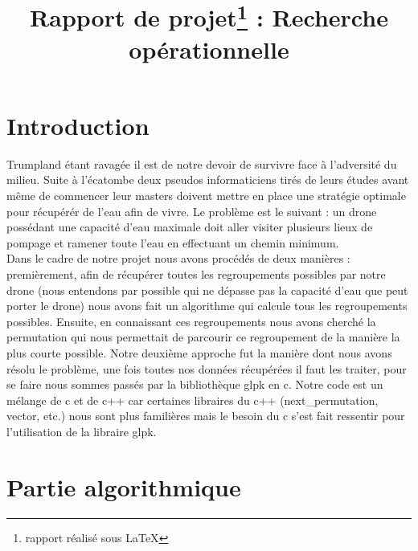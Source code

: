 \documentclass[a4paper,sffamily,12pt]{article}
\title{\vspace{\fill}\LARGE\bfseries\sffamily Rapport de projet\protect\footnote{rapport réalisé sous \LaTeX} : Recherche opérationnelle\vspace{\fill}}
\begin{document}
	\date{} %
	\maketitle %

	\thispagestyle{fancy} %
	
	\newpage
			
	\renewcommand{\contentsname}{Sommaire}
	\tableofcontents
	
	\newpage
	
	\section{Introduction}
	
		\vspace{0.5cm}

			Trumpland étant ravagée il est de notre devoir de survivre face à l'adversité du milieu. Suite à l'écatombe deux pseudos informaticiens tirés de leurs études avant même de commencer leur masters doivent mettre en place une stratégie optimale pour récupérér de l'eau afin de vivre. Le problème est le suivant : un drone possédant une capacité d'eau maximale doit aller visiter plusieurs lieux de pompage et ramener toute l'eau en effectuant un chemin minimum.\\
Dans le cadre de notre projet nous avons procédés de deux manières : premièrement, afin de récupérer toutes les regroupements possibles par notre drone (nous entendons par possible qui ne dépasse pas la capacité d'eau que peut porter le drone) nous avons fait un algorithme qui calcule tous les regroupements possibles. Ensuite, en connaissant ces regroupements nous avons cherché la permutation qui nous permettait de parcourir ce regroupement de la manière la plus courte possible. Notre deuxième approche fut la manière dont nous avons résolu le problème, une fois toutes nos données récupérées il faut les traiter, pour se faire nous sommes passés par la bibliothèque glpk en c. Notre code est un mélange de c et de c++ car certaines libraires du c++ (next\_permutation, vector, etc.) nous sont plus familières mais le besoin du c s'est fait ressentir pour l'utilisation de la libraire glpk.

	\section{Partie algorithmique}
	
		\vspace{0.5cm}
		
\end{document}
